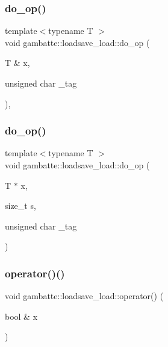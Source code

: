 \subsubsection{\texorpdfstring{do\+\_\+op()}{do\_op()}\hspace{0.1cm}{\footnotesize\ttfamily [2/3]}}
{\footnotesize\ttfamily template$<$typename T $>$ \\
void gambatte\+::loadsave\+\_\+load\+::do\+\_\+op (\begin{DoxyParamCaption}\item[{T \&}]{x,  }\item[{unsigned char}]{\+\_\+tag }\end{DoxyParamCaption})\hspace{0.3cm}{\ttfamily [inline]}, {\ttfamily [private]}}

\mbox{\label{classgambatte_1_1loadsave__load_a9f958d9dff1f36f82b393c8cf4c734cb}} 
\subsubsection{\texorpdfstring{do\+\_\+op()}{do\_op()}\hspace{0.1cm}{\footnotesize\ttfamily [3/3]}}
{\footnotesize\ttfamily template$<$typename T $>$ \\
void gambatte\+::loadsave\+\_\+load\+::do\+\_\+op (\begin{DoxyParamCaption}\item[{T $\ast$}]{x,  }\item[{size\+\_\+t}]{s,  }\item[{unsigned char}]{\+\_\+tag }\end{DoxyParamCaption})\hspace{0.3cm}{\ttfamily [private]}}

\mbox{\label{classgambatte_1_1loadsave__load_a551d7c208300ff066c9725c3efff8aa9}} 
\subsubsection{\texorpdfstring{operator()()}{operator()()}\hspace{0.1cm}{\footnotesize\ttfamily [1/19]}}
{\footnotesize\ttfamily void gambatte\+::loadsave\+\_\+load\+::operator() (\begin{DoxyParamCaption}\item[{bool \&}]{x }\end{DoxyParamCaption})\hspace{0.3cm}{\ttfamily [virtual]}}



